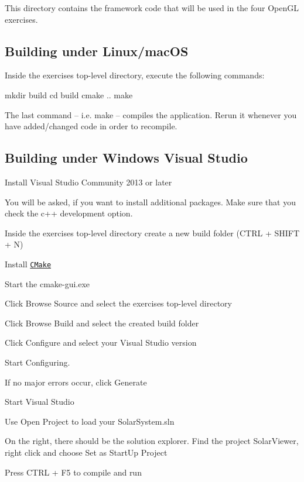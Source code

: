This directory contains the framework code that will be used in the four Open\+GL exercises.

\subsection*{Building under Linux/mac\+OS }

Inside the exercise\textquotesingle{}s top-\/level directory, execute the following commands\+: \begin{DoxyVerb}mkdir build
cd build
cmake ..
make
\end{DoxyVerb}


The last command -- i.\+e. {\ttfamily make} -- compiles the application. Rerun it whenever you have added/changed code in order to recompile.

\subsection*{Building under Windows Visual Studio }


\begin{DoxyItemize}
\item Install Visual Studio Community 2013 or later
\item You will be asked, if you want to install additional packages. Make sure that you check the c++ development option.
\item Inside the exercise\textquotesingle{}s top-\/level directory create a new {\ttfamily build} folder (C\+T\+RL + S\+H\+I\+FT + N)
\item Install \href{https://cmake.org/download/}{\tt C\+Make}
\item Start the cmake-\/gui.\+exe
\item Click {\ttfamily Browse Source} and select the exercise\textquotesingle{}s top-\/level directory
\item Click {\ttfamily Browse Build} and select the created {\ttfamily build} folder
\item Click {\ttfamily Configure} and select your Visual Studio version
\item Start Configuring.
\item If no major errors occur, click {\ttfamily Generate}
\item Start Visual Studio
\item Use {\ttfamily Open Project} to load your {\ttfamily Solar\+System.\+sln}
\item On the right, there should be the solution explorer. Find the project {\ttfamily Solar\+Viewer}, right click and choose {\ttfamily Set as Start\+Up Project}
\item Press C\+T\+RL + F5 to compile and run
\end{DoxyItemize}


